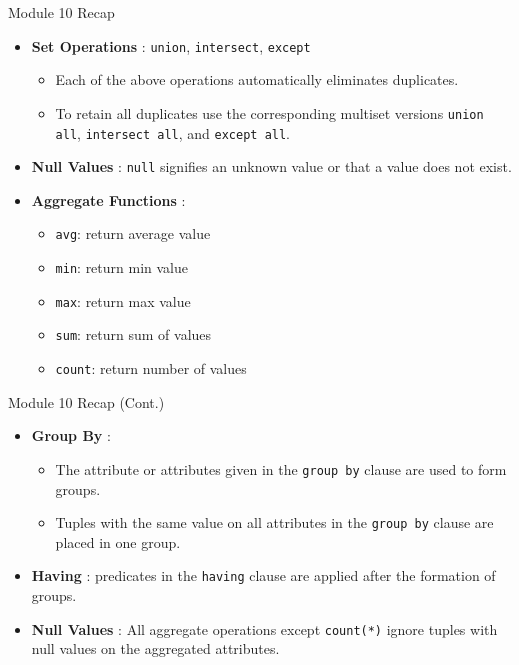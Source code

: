 \documentclass[aspectratio=169, xcolor=dvipsnames]{beamer}
\begin{document}
\begin{frame}{Module 10 Recap}
    \begin{itemize}[<+->]
        \item \textbf{Set Operations} : \texttt{union}, \texttt{intersect}, \texttt{except}
        \begin{itemize}
            \item[$\triangleright$] Each of the above operations automatically eliminates duplicates.
            \item[$\triangleright$] To retain all duplicates use the corresponding multiset versions \texttt{union all}, \texttt{intersect all}, and \texttt{except all}.
        \end{itemize}
        \item \textbf{Null Values} : \texttt{null} signifies an unknown value or that a value does not exist.
        \item \textbf{Aggregate Functions} :
        \begin{itemize}
            \item[$\triangleright$] \texttt{avg}: return average value
            \item[$\triangleright$] \texttt{min}: return min value
            \item[$\triangleright$] \texttt{max}: return max value
            \item[$\triangleright$] \texttt{sum}: return sum of values
            \item[$\triangleright$] \texttt{count}: return number of values
        \end{itemize}
    \end{itemize}
\end{frame}

\begin{frame}{Module 10 Recap (Cont.)}
    \begin{itemize}[<+->]
        \item \textbf{Group By} :
        \begin{itemize}
            \item[$\triangleright$] The attribute or attributes given in the \texttt{group by} clause are used to form groups.
            \item[$\triangleright$] Tuples with the same value on all attributes in the \texttt{group by} clause are placed in one group.
        \end{itemize}
        \item \textbf{Having} : predicates in the \texttt{having} clause are applied after the formation of groups.
        \item \textbf{Null Values} : All aggregate operations except \texttt{count(*)} ignore tuples with null values on the aggregated attributes.
    \end{itemize}
\end{frame}
\end{document}
